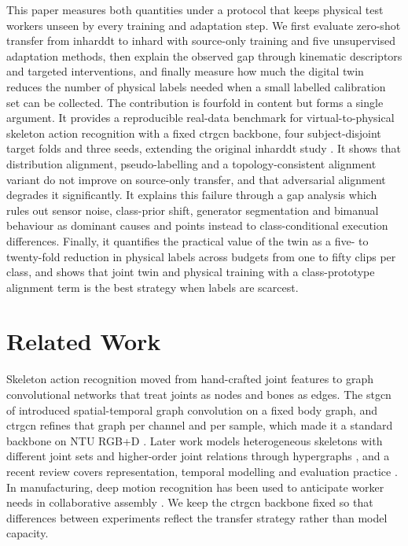 \documentclass[]{interact}
\begin{document}
This paper measures both quantities under a protocol that keeps physical test
workers unseen by every training and adaptation step. We first evaluate
zero-shot transfer from \ac{inharddt} to \ac{inhard} with source-only
training and five unsupervised adaptation methods, then explain the observed
gap through kinematic descriptors and targeted interventions, and finally
measure how much the digital twin reduces the number of physical labels needed
when a small labelled calibration set can be collected. The contribution is
fourfold in content but forms a single argument. It provides a reproducible
real-data benchmark for virtual-to-physical skeleton action recognition with a
fixed \ac{ctrgcn} backbone, four subject-disjoint target folds and three
seeds, extending the original \ac{inharddt} study \citep{dallel2023digital}.
It shows that distribution alignment, pseudo-labelling and a
topology-consistent alignment variant do not improve on source-only transfer,
and that adversarial alignment degrades it significantly. It explains this
failure through a gap analysis which rules out sensor noise, class-prior shift,
generator segmentation and bimanual behaviour as dominant causes and points
instead to class-conditional execution differences. Finally, it quantifies the
practical value of the twin as a five- to twenty-fold reduction in physical
labels across budgets from one to fifty clips per class, and shows that joint
twin and physical training with a class-prototype alignment term is the best
strategy when labels are scarcest.

\section{Related Work}
\label{sec:related}

Skeleton action recognition moved from hand-crafted joint features to graph
convolutional networks that treat joints as nodes and bones as edges. The
\ac{stgcn} of \citet{yan2018stgcn} introduced spatial-temporal graph
convolution on a fixed body graph, and \ac{ctrgcn} \citep{chen2021ctrgcn}
refines that graph per channel and per sample, which made it a standard
backbone on NTU RGB+D \citep{shahroudy2016ntu,liu2020ntu120}. Later work models
heterogeneous skeletons with different joint sets \citep{wang2025heterogeneous}
and higher-order joint relations through hypergraphs \citep{chen2025hypergraph},
and a recent review covers representation, temporal modelling and evaluation
practice \citep{liu2025skeletonreview}. In manufacturing, deep motion
recognition has been used to anticipate worker needs in collaborative
assembly \citep{wang2018hrcmotion}. We keep the \ac{ctrgcn} backbone fixed so
that differences between experiments reflect the transfer strategy rather than
model capacity.
\end{document}
